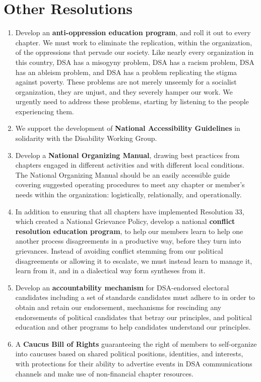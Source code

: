 \documentclass[10pt]{memoir}
\begin{document}
\section*{Other Resolutions}
\begin{enumerate}
\item{Develop an \textbf{anti-oppression education program}, and roll it out to every chapter. We must work to eliminate the replication, within the organization, of the oppressions that pervade our society. Like nearly every organization in this country, DSA has a misogyny problem, DSA has a racism problem, DSA has an ableism problem, and DSA has a problem replicating the stigma against poverty. These problems are not merely unseemly for a socialist organization, they are unjust, and they severely hamper our work. We urgently need to address these problems, starting by listening to the people experiencing them.}
\item{We support the development of \textbf{National Accessibility Guidelines} in solidarity with the Disability Working Group.}
\item{Develop a \textbf{National Organizing Manual}, drawing best practices from chapters engaged in different activities and with different local conditions. The National Organizing Manual should be an easily accessible guide covering suggested operating procedures to meet any chapter or member's needs within the organization: logistically, relationally, and operationally.}
\item{In addition to ensuring that all chapters have implemented Resolution 33, which created a National Grievance Policy, develop a national \textbf{conflict resolution education program}, to help our members learn to help one another process disagreements in a productive way, before they turn into grievances. Instead of avoiding conflict stemming from our political disagreements or allowing it to escalate, we must instead learn to manage it, learn from it, and in a dialectical way form syntheses from it.}
\item{Develop an \textbf{accountability mechanism} for DSA-endorsed electoral candidates including a set of standards candidates must adhere to in order to obtain and retain our endorsement, mechanisms for rescinding any endorsements of political candidates that betray our principles, and political education and other programs to help candidates understand our principles.}
\pagebreak
\item{A \textbf{Caucus Bill of Rights} guaranteeing the right of members to self-organize into caucuses based on shared political positions, identities, and interests, with protections for their ability to advertise events in DSA communications channels and make use of non-financial chapter resources.}

\end{enumerate}
\end{document}
